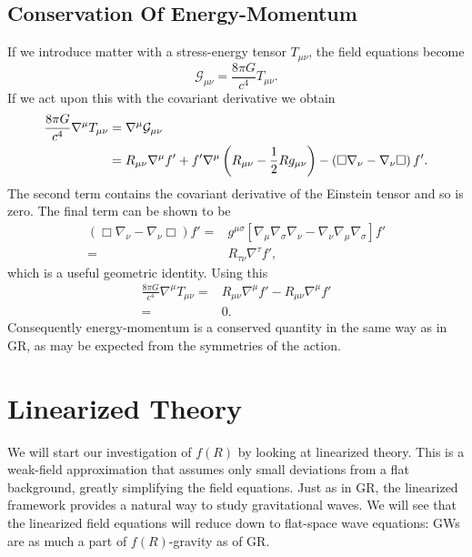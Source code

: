 \subsection{Conservation Of Energy-Momentum}

If we introduce matter with a stress-energy tensor $T_{\mu\nu}$, the field equations become
\begin{equation}
\mathcal{G}_{\mu\nu} = \frac{8\pi G}{c^4}T_{\mu\nu}.
\end{equation}
If we act upon this with the covariant derivative we obtain
\begin{align}
\frac{8\pi G}{c^4}\nabla^\mu T_{\mu\nu} = {} & \nabla^\mu\mathcal{G}_{\mu\nu} \nonumber \\
= {} & R_{\mu\nu}\nabla^\mu f' + f'\nabla^\mu\left(R_{\mu\nu} - \frac{1}{2}R g_{\mu\nu}\right) - \left(\Box\nabla_\nu - \nabla_\nu\Box\right)f'.
\end{align}
The second term contains the covariant derivative of the Einstein tensor and so is zero. The final term can be shown to be
\begin{align}
\left(\Box\nabla_\nu - \nabla_\nu\Box\right)f' = {} & g^{\mu\sigma}\left[\nabla_\mu\nabla_\sigma\nabla_\nu - \nabla_\nu\nabla_\mu\nabla_\sigma\right]f' \nonumber \\
 = {} & R_{\tau\nu}\nabla^\tau f',
\end{align}
which is a useful geometric identity\cite{Koivisto2006a}. Using this
\begin{align}
\frac{8\pi G}{c^4}\nabla^\mu T_{\mu\nu} = {} & R_{\mu\nu}\nabla^\mu f' - R_{\mu\nu}\nabla^\mu f' \nonumber \\
 = {} & 0.
\end{align}
Consequently energy-momentum is a conserved quantity in the same way as in GR, as may be expected from the symmetries of the action.

\section{Linearized Theory}\label{sec:Lin}

We will start our investigation of $f(R)$ by looking at linearized theory. This is a weak-field approximation that assumes only small deviations from a flat background, greatly simplifying the field equations. Just as in GR, the linearized framework provides a natural way to study gravitational waves. We will see that the linearized field equations will reduce down to flat-space wave equations: GWs are as much a part of $f(R)$-gravity as of GR.

